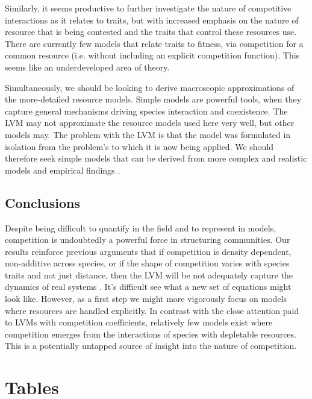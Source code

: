 \documentclass[a4paper,11pt]{article}
\begin{document}
Similarly, it seems productive to further investigate the nature of competitive interactions as it relates to traits, but with increased emphasis on the nature of resource that is being contested and the traits that control these resources use. There are currently few models that relate traits to fitness, via competition for a common resource (i.e. without including an explicit competition function). This seems like an underdeveloped area of theory.

Simultaneously, we should be looking to derive macroscopic approximations of the more-detailed resource models. 
Simple models are powerful tools, when they capture general mechanisms driving species interaction and coexistence. The LVM may not approximate the resource models used here very well, but other models may.   The problem with the LVM is that the model was formulated in isolation from the problem's to which it is now being applied. We should therefore seek simple models that can be derived from more complex and realistic models and empirical findings \citep[e.g.][]{Champagnat-2006}.

\subsection{Conclusions}

Despite being difficult to quantify in the field and to represent in models, competition is undoubtedly a powerful force in structuring communities. Our results reinforce previous arguments that if competition is density dependent, non-additive across species, or if the shape of competition varies with species traits and not just distance, then the LVM will be not adequately capture the dynamics of real systems \citep{Andrewartha-1953, Neill-1974, Abrams-1975, Wangersky-1978,Abrams-1980, Tilman-1987}. It's difficult see what a new set of equations might look like. However, as a first step we might more vigorously focus on models where resources are handled explicitly. In contrast with the close attention paid to LVMs with competition coefficients, relatively few models exist where competition emerges from the interactions of species with depletable resources. This is a potentially untapped source of insight into the nature of competition.

\clearpage

\section{Tables}
\end{document}
